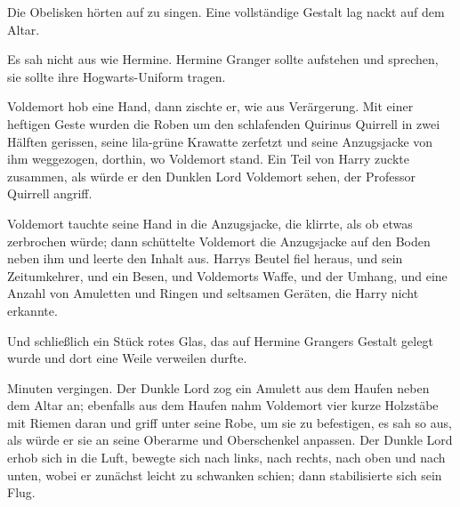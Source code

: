 Die Obelisken hörten auf zu singen. Eine vollständige Gestalt lag nackt auf dem Altar.

Es sah nicht aus wie Hermine. Hermine Granger sollte aufstehen und sprechen, sie sollte ihre Hogwarts-Uniform tragen.

Voldemort hob eine Hand, dann zischte er, wie aus Verärgerung. Mit einer heftigen Geste wurden die Roben um den schlafenden Quirinus Quirrell in zwei Hälften gerissen, seine lila-grüne Krawatte zerfetzt und seine Anzugsjacke von ihm weggezogen, dorthin, wo Voldemort stand. Ein Teil von Harry zuckte zusammen, als würde er den Dunklen Lord Voldemort sehen, der Professor Quirrell angriff.

Voldemort tauchte seine Hand in die Anzugsjacke, die klirrte, als ob etwas zerbrochen würde; dann schüttelte Voldemort die Anzugsjacke auf den Boden neben ihm und leerte den Inhalt aus. Harrys Beutel fiel heraus, und sein Zeitumkehrer, und ein Besen, und Voldemorts Waffe, und der Umhang, und eine Anzahl von Amuletten und Ringen und seltsamen Geräten, die Harry nicht erkannte.

Und schließlich ein Stück rotes Glas, das auf Hermine Grangers Gestalt gelegt wurde und dort eine Weile verweilen durfte.

Minuten vergingen. Der Dunkle Lord zog ein Amulett aus dem Haufen neben dem Altar an; ebenfalls aus dem Haufen nahm Voldemort vier kurze Holzstäbe mit Riemen daran und griff unter seine Robe, um sie zu befestigen, es sah so aus, als würde er sie an seine Oberarme und Oberschenkel anpassen.
Der Dunkle Lord erhob sich in die Luft, bewegte sich nach links, nach rechts, nach oben und nach unten, wobei er zunächst leicht zu schwanken schien; dann stabilisierte sich sein Flug.

